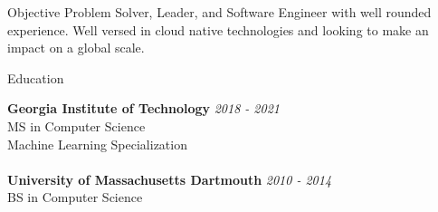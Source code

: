 \documentclass{resume} %
\begin{document}
\begin{rSection}{Objective} 
Problem Solver, Leader, and Software Engineer with well rounded experience. Well versed in cloud native technologies and looking to make an impact on a global scale.
\end{rSection}

\begin{rSection}{Education}

{\bf Georgia Institute of Technology} \hfill {\em 2018 - 2021} 
\\ MS in Computer Science \hfill 
\\ Machine Learning Specialization
\\
\\{\bf University of Massachusetts Dartmouth} \hfill {\em 2010 - 2014} 
\\ BS in Computer Science \hfill

\end{rSection}
\end{document}
